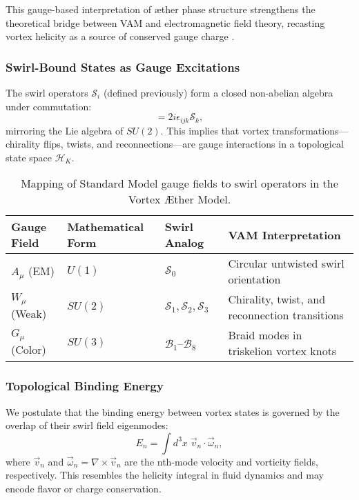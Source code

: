 This gauge-based interpretation of æther phase structure strengthens the theoretical bridge between VAM and electromagnetic field theory, recasting vortex helicity as a source of conserved gauge charge \cite{verlinde2021qft, gross1996gauge, strangeway2005alfven}.


\subsubsection*{Swirl-Bound States as Gauge Excitations}

The swirl operators $\mathcal{S}_i$ (defined previously) form a closed non-abelian algebra under commutation:
\begin{equation}
[\mathcal{S}_i, \mathcal{S}_j] = 2i \epsilon_{ijk} \mathcal{S}_k,
\end{equation}
mirroring the Lie algebra of $SU(2)$. This implies that vortex transformations—chirality flips, twists, and reconnections—are gauge interactions in a topological state space $\mathcal{H}_K$.

\begin{table}[H]
    \centering
    \footnotesize
    \renewcommand{\arraystretch}{1.4}
    \begin{tabular}{|l|l|l|l|}
        \hline
        \textbf{Gauge Field} & \textbf{Mathematical Form} & \textbf{Swirl Analog} & \textbf{VAM Interpretation} \\
        \hline
        $A_\mu$ (EM) & $U(1)$ & $\mathcal{S}_0$ & Circular untwisted swirl orientation \\
        $W_\mu$ (Weak) & $SU(2)$ & $\mathcal{S}_1, \mathcal{S}_2, \mathcal{S}_3$ & Chirality, twist, and reconnection transitions \\
        $G_\mu$ (Color) & $SU(3)$ & $\mathcal{B}_1$–$\mathcal{B}_8$ & Braid modes in triskelion vortex knots \\
        \hline
    \end{tabular}
    \caption{Mapping of Standard Model gauge fields to swirl operators in the Vortex Æther Model.}
\end{table}

\subsubsection*{Topological Binding Energy}

We postulate that the binding energy between vortex states is governed by the overlap of their swirl field eigenmodes:
\begin{equation}
E_{n} = \int d^3x \; \vec{v}_n \cdot \vec{\omega}_n,
\end{equation}
where $\vec{v}_n$ and $\vec{\omega}_n = \nabla \times \vec{v}_n$ are the nth-mode velocity and vorticity fields, respectively. This resembles the helicity integral in fluid dynamics and may encode flavor or charge conservation.


